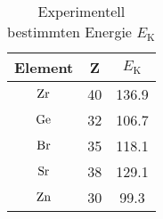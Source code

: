 \begin{table}
\centering
\caption{Experimentell bestimmten Energie $E_{\mathrm{K}}$}
\label{tab: ener_ryd}
\begin{tabular}{S S S}
\toprule
{Element} & {Z} & {$E_{\mathrm{K}}$}  \\
\midrule
$\ce{Zr}$& 40  & 136.9\\ 
$\ce{Ge}$ & 32  & 106.7\\
$\ce{Br}$ &35  & 118.1\\
$\ce{Sr}$ &38  & 129.1\\
 $\ce{Zn}$ &30  & 99.3\\
\bottomrule
\end{tabular}
\end{table}
